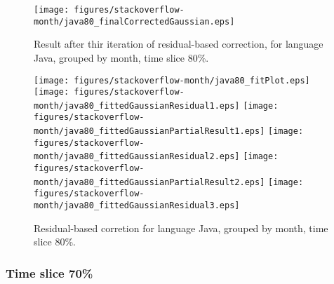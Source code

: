 \begin{figure}[]
\centering
{\texttt{[image: figures/stackoverflow-month/java80\_finalCorrectedGaussian.eps]}}
\caption{Result after thir iteration of residual-based correction, for language Java, grouped by month, time slice 80\%.}
\end{figure}


\begin{figure}[hb]
\centering
{}
{\texttt{[image: figures/stackoverflow-month/java80\_fitPlot.eps]}}
{\texttt{[image: figures/stackoverflow-month/java80\_fittedGaussianResidual1.eps]}}
{\texttt{[image: figures/stackoverflow-month/java80\_fittedGaussianPartialResult1.eps]}}
{\texttt{[image: figures/stackoverflow-month/java80\_fittedGaussianResidual2.eps]}}
{\texttt{[image: figures/stackoverflow-month/java80\_fittedGaussianPartialResult2.eps]}}
{\texttt{[image: figures/stackoverflow-month/java80\_fittedGaussianResidual3.eps]}}
\caption{Residual-based corretion for language Java, grouped by month, time slice 80\%.}
\end{figure}


\clearpage 
\newpage 


\FloatBarrier

\subsubsection{Time slice 70\%}

